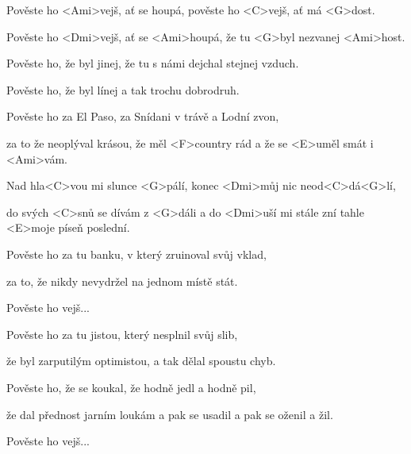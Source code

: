 
\zs

Pověste ho <Ami>vejš, ať se houpá,
pověste ho <C>vejš, ať má <G>dost.

Pověste ho <Dmi>vejš, ať se <Ami>houpá,
že tu <G>byl nezvanej <Ami>host.

\ks
\zs

Pověste ho, že byl jinej,
že tu s námi dejchal stejnej vzduch.

Pověste ho, že byl línej
a tak trochu dobrodruh.

\ks
\zs

Pověste ho za El Paso,
za Snídani v trávě a Lodní zvon,

za to že neoplýval krásou,
že měl <F>country rád a že se <E>uměl smát i <Ami>vám.

\ks
\zr

Nad hla<C>vou mi slunce <G>pálí,
konec <Dmi>můj nic neod<C>dá<G>lí,

do svých <C>snů se dívám z <G>dáli
a do <Dmi>uší mi stále zní tahle <E>moje píseň poslední.

\kr
\zs

Pověste ho za tu banku,
v který zruinoval svůj vklad,

za to, že nikdy nevydržel
na jednom místě stát.

\ks
\zr \kr
\zs

Pověste ho vejš...

\ks
\zs

Pověste ho za tu jistou,
který nesplnil svůj slib,

že byl zarputilým optimistou,
a tak dělal spoustu chyb.

\ks
\zs

Pověste ho, že se koukal,
že hodně jedl a hodně pil,

že dal přednost jarním loukám
a pak se usadil a pak se oženil
a žil.

\ks
\zs

Pověste ho vejš...

\ks
\kp






